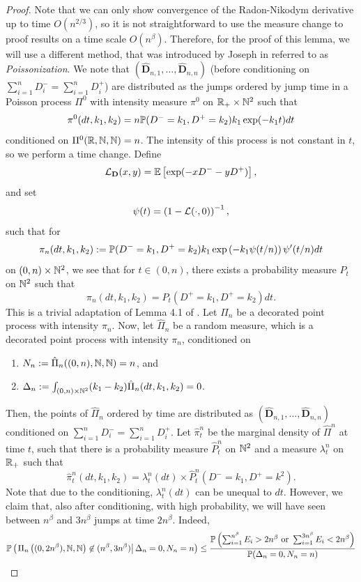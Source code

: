 \begin{proof}
Note that we can only show convergence of the Radon-Nikodym derivative up to time $O(n^{2/3})$, so it is not straightforward to use the measure change to proof results on a time scale $O(n^\beta)$. Therefore, for the proof of this lemma, we will use a different method, that was introduced by Joseph in \cite{Joseph2014} referred to as \emph{Poissonization}. We note that $(\mathbf{\hat{D}}_{n,1},\dots,\mathbf{\hat{D}}_{n,n})$ (before conditioning on $\sum_{i=1}^nD^-_i=\sum_{i=1}^nD^+_i$) are distributed as the jumps ordered by jump time in a Poisson process $\Pi^0$ with intensity measure $\pi^0$ on $\R_+\times \N^2$ such that $$\pi^0(dt,k_1,k_2)=n\P(D^-=k_1,D^+=k_2)k_1\exp(-k_1 t)dt$$
conditioned on $\Pi^0(\R,\N,\N)=n$.
The intensity of this process is not constant in $t$, so we perform a time change. Define
$$\cL_{\mathbf{D}}(x,y)=\E\left[\exp(-xD^--yD^+)\right],$$
and set 
$$\psi(t)=\left(1-\cL(\cdot,0)\right)^{-1},$$
such that for 
$$\pi_n(dt,k_1,k_2):=\P(D^-=k_1,D^+=k_2)k_1\exp\left(-k_1 \psi(t/n)\right)\psi'(t/n)dt$$
on $(0,n)\times \N^2$, we see that for $t\in (0,n)$, there exists a probability measure $P_t$ on $\N^2$ such that
$$\pi_n(dt,k_1,k_2)=P_t(D^+=k_1,D^+=k_2)dt.$$
This is a trivial adaptation of Lemma 4.1 of \cite{Joseph2014}. Let ${\Pi}_n$ be a decorated point process with intensity $\pi_n$. Now, let $\hat{\Pi}_n$ be a random measure, which is a decorated point process with intensity $\pi_n$, conditioned on 
\begin{enumerate}
    \item $N_n:=\hat{\Pi}_n((0,n),\N,\N)=n$, and 
    \item $\Delta_n:=\int_{(0,n)\times \N^2}(k_1-k_2)\hat{\Pi}_n(dt,k_1,k_2)=0$.
\end{enumerate}
Then, the points of $\hat{\Pi}_n$ ordered by time are distributed as $(\mathbf{\hat{D}}_{n,1},\dots,\mathbf{\hat{D}}_{n,n})$ conditioned on $\sum_{i=1}^nD^-_i=\sum_{i=1}^nD^+_i$. Let $\hat{\pi}^n_t$ be the marginal density of $\hat{\Pi}^n$ at time $t$, such that there is a probability measure $\hat{P}^n_t$ on $\N^2$  and a measure $\lambda^n_t$ on $\R_+$ such that $$\hat{\pi}^n_t(dt,k_1,k_2)=\lambda^n_t(dt)\times \hat{P}^n_t(D^-=k_1, D^+=k^2).$$
Note that due to the conditioning, $\lambda^n_t(dt)$ can be unequal to $dt$. However, we claim that, also after conditioning, with high probability, we will have seen between $n^\beta$ and $3n^\beta$ jumps at time $2n^{\beta}$. Indeed,
\begin{align}\begin{split}\label{eq.numberofjumpsinrandommeasure}\P\left(\left.\Pi_n\left((0,2n^{\beta}),\N,\N\right)\not\in (n^\beta,3n^\beta)\right|\Delta_n=0, N_n=n\right)&\leq \frac{\P\left(\sum_{i=1}^{n^\beta}E_i>2n^{\beta}\text{ or }\sum_{i=1}^{3n^\beta}E_i<2n^{\beta}\right)}{\P(\Delta_n=0, N_n=n)}\\

\end{split}
\end{align}
\end{proof}
